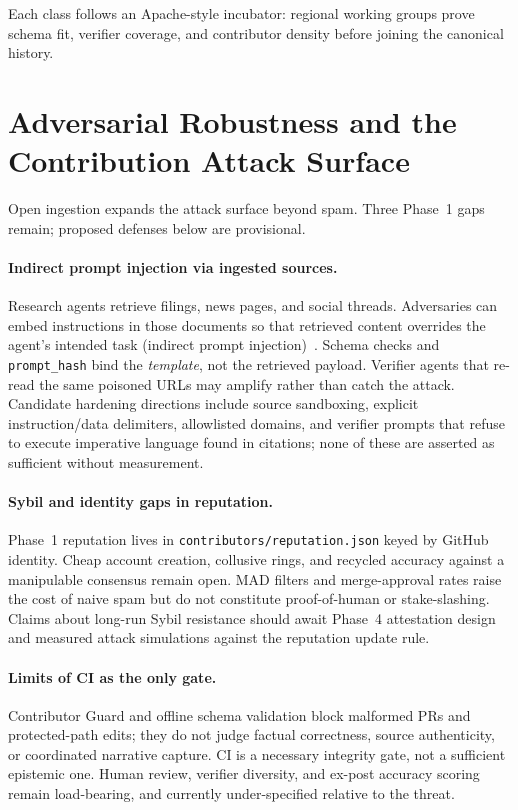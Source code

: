\documentclass[10pt,twocolumn]{article}
\begin{document}
Each class follows an Apache-style incubator: regional working groups prove schema fit, verifier coverage, and contributor density before joining the canonical history.

\section{Adversarial Robustness and the Contribution Attack Surface}
\label{sec:adversarial}

Open ingestion expands the attack surface beyond spam. Three Phase~1 gaps remain; proposed defenses below are provisional.

\paragraph{Indirect prompt injection via ingested sources.}
Research agents retrieve filings, news pages, and social threads. Adversaries can embed instructions in those documents so that retrieved content overrides the agent's intended task (indirect prompt injection)~\cite{greshake2023}. Schema checks and \texttt{prompt\_hash} bind the \emph{template}, not the retrieved payload. Verifier agents that re-read the same poisoned URLs may amplify rather than catch the attack. Candidate hardening directions include source sandboxing, explicit instruction/data delimiters, allowlisted domains, and verifier prompts that refuse to execute imperative language found in citations; none of these are asserted as sufficient without measurement.

\paragraph{Sybil and identity gaps in reputation.}
Phase~1 reputation lives in \texttt{contributors/reputation.json} keyed by GitHub identity. Cheap account creation, collusive rings, and recycled accuracy against a manipulable consensus remain open. MAD filters and merge-approval rates raise the cost of naive spam but do not constitute proof-of-human or stake-slashing. Claims about long-run Sybil resistance should await Phase~4 attestation design and measured attack simulations against the reputation update rule.

\paragraph{Limits of CI as the only gate.}
Contributor Guard and offline schema validation block malformed PRs and protected-path edits; they do not judge factual correctness, source authenticity, or coordinated narrative capture. CI is a necessary integrity gate, not a sufficient epistemic one. Human review, verifier diversity, and ex-post accuracy scoring remain load-bearing, and currently under-specified relative to the threat.
\end{document}
